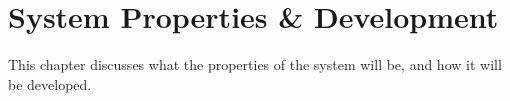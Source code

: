 \chapter{System Properties \& Development}
This chapter discusses what the properties of the system will be, and how it will be developed.


